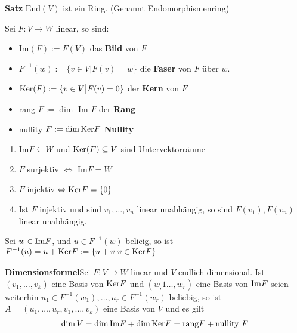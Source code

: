 \textbf{Satz} $\text{End}(V)$ ist ein Ring. (Genannt Endomorphismenring)
\begin{mdframed}
Sei $F: V \rightarrow W$ linear, so sind:
\begin{itemize}
    \item $\text{Im}(F) := F(V)$ das \textbf{Bild} von $F$
    
    \item $F^{-1}(w) := \{v \in V \big\vert F(v) = w\}$ die \textbf{Faser} von $F$ über $w$.
    
    \item $\text{Ker}(F) := \{v \in V \big\vert F(v) = 0\}$ der \textbf{Kern} von $F$
    
    \item rang $F := \dim$ Im $F$ der \textbf{Rang}
    
    \item nullity $F := \dim \text{Ker} F$ \textbf{Nullity}
\end{itemize}
\end{mdframed}
\begin{enumerate}[{(}a{)}]
    \item $\text{Im}F \subseteq W$ und $\text{Ker}(F) \subseteq V$ sind Untervektorräume
    
    \item $F$ surjektiv $\Leftrightarrow$ Im$F = W$
    
    \item $F$ injektiv $\Leftrightarrow \text{Ker} F = \{0\}$
    
    \item Ist $F$ injektiv und sind $v_1, \ldots, v_n$ linear unabhängig, so sind $F(v_1), F(v_n)$ linear unabhängig.
\end{enumerate}
Sei $w \in \text{Im} F$, und $u \in F^{-1}(w)$ belieig, so ist $F^{-1}(u) = u + \text{Ker} F:= \{u + v \big\vert v \in \text{Ker} F\}$
\begin{mdframed}
\textbf{Dimensionsformel}\quad Sei $F: V \rightarrow W$ linear und $V$ endlich dimensional. Ist $(v_1, \ldots, v_k)$ eine Basis von $\text{Ker} F$ und $(w_,1 \ldots, w_r)$ eine Basis von $\text{Im} F$ seien weiterhin $u_1 \in F^{-1}(w_1), \ldots, u_r \in F^{-1}(w_r)$ beliebig, so ist $A = (u_1, \ldots, u_r, v_1, \ldots, v_k)$ eine Basis von $V$ und es gilt 
\begin{align*}
    \dim V = \dim \text{Im} F + \dim \text{Ker} F = \text{rang} F + \text{nullity }F
\end{align*}

\end{mdframed}
